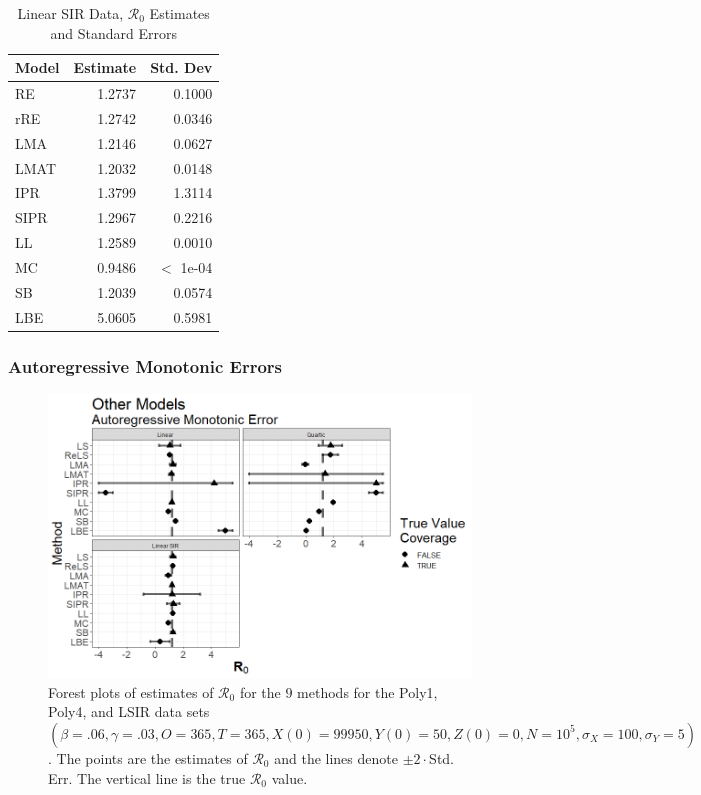 \documentclass[12pt]{article}
\newcommand{\xxsir}{\ensuremath{9} } %
\newcommand{\rr}{\ensuremath{\mathcal{R}_0}}
\begin{document}
\begin{table}[H]
	
	\centering
	\begin{tabular}[t]{l|r|r}
		\hline
		Model & Estimate & Std. Dev\\
		\hline
		RE & 1.2737 & 0.1000\\
		\hline
		rRE & 1.2742 & 0.0346\\
		\hline
		LMA & 1.2146 & 0.0627\\
		\hline
		LMAT & 1.2032 & 0.0148\\
		\hline
		IPR & 1.3799 & 1.3114\\
		\hline
		SIPR & 1.2967 & 0.2216\\
		\hline
		LL & 1.2589 & 0.0010\\
		\hline
		MC & 0.9486 & $<$ 1e-04\\
		\hline
		SB & 1.2039 & 0.0574\\
		\hline
		LBE & 5.0605 & 0.5981\\
		\hline
	\end{tabular}
	\caption{Linear SIR Data, $\rr$ Estimates and Standard Errors}
\end{table}

\subsubsection{Autoregressive Monotonic Errors}

\begin{figure}[H]
	\begin{center}
		\includegraphics[scale=0.5]{images/other_arm.tiff}
		\caption{Forest plots of estimates of $\rr$ for the \xxsir methods for the Poly1, Poly4, and LSIR data sets $(\beta=.06, \gamma=.03, O=365, T=365, X(0)=99950, Y(0)=50, Z(0)=0, N=10^5, \sigma_X=100, \sigma_Y=5)$.  The points are the estimates of $\rr$ and the lines denote $\pm 2\cdot $Std. Err.  The vertical line is the true $\rr$ value.}
	\end{center}
\end{figure}
\end{document}
